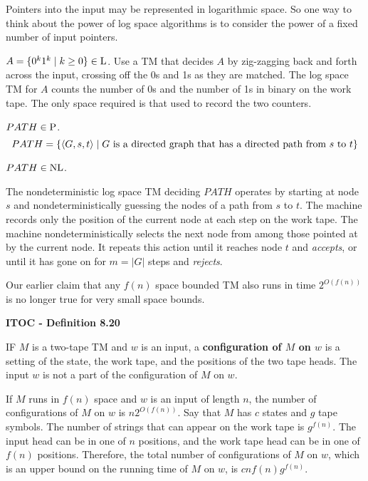 Pointers into the input may be represented in logarithmic space. So one way to think about the power of log space algorithms is to consider the power of a fixed number of input pointers.

$A = \{ 0^k 1^k \mid k \geq 0 \} \in \L$. Use a TM that decides $A$ by zig-zagging back and forth across the input, crossing off the 0s and 1s as they are matched. The log space TM for $A$ counts the number of 0s and the number of 1s in binary on the work tape. The only space required is that used to record the two counters.

\medskip
$PATH \in \P$.
\label{lang:PATH_NL}
\[
PATH = \{
\desc{G,s,t} \mid \text{$G$ is a directed graph that has a directed path from $s$ to $t$}
\}
\]
\begin{shaded}
$PATH \in \NL$.
\end{shaded}
\begin{mdframed}
The nondeterministic log space TM deciding $PATH$ operates by starting at node $s$ and nondeterministically guessing the nodes of a path from $s$ to $t$. The machine records only the position of the current node at each step on the work tape. The machine nondeterministically selects the next node from among those pointed at by the current node. It repeats this action until it reaches node $t$ and \textit{accepts}, or until it has gone on for $m = |G|$ steps and \textit{rejects}.
\end{mdframed}

{\color{blue} Our earlier claim that any $f(n)$ space bounded TM also runs in time $2^{O(f(n))}$ is no longer true for very small space bounds.}

\begin{shaded}
\textbf{ITOC - Definition 8.20}

\medskip
IF $M$ is a two-tape TM and $w$ is an input, a \textbf{configuration of $M$ on $w$} is a setting of the state, the work tape, and the positions of the two tape heads. The input $w$ is not a part of the configuration of $M$ on $w$.
\end{shaded}

If $M$ runs in $f(n)$ space and $w$ is an input of length $n$, the number of configurations of $M$ on $w$ is $n2^{O(f(n))}$. Say that $M$ has $c$ states and $g$ tape symbols. The number of strings that can appear on the work tape is  $g^{f(n)}$. The input head can be in one of $n$ positions, and the work tape head can be in one of $f(n)$ positions. Therefore, the total number of configurations of $M$ on $w$, which is an upper bound on the running time of $M$ on $w$, is $cnf(n)g^{f(n)}$.

